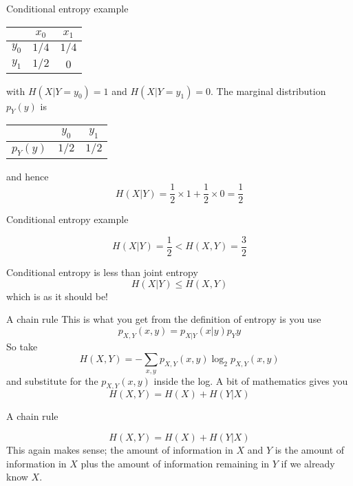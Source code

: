 \documentclass{beamer}
\newcommand{\crish}{\color{reddish}}
\newcommand{\cbla}{\color{black}}
\newcommand{\sm}{\color{reddish}$}
\newcommand{\fm}{$\color{black}{}}
\begin{document}
\begin{frame}{Conditional entropy example}
\begin{center}
\color{purple}
    \begin{tabular}{c|cc}
&$x_0$&$x_1$\\
\hline
$y_0$&$1/4$&$1/4$\\
$y_1$&$1/2$&$0$
    \end{tabular}
    \color{black}
\end{center}
with \sm{}H(X|Y=y_0)=1\fm{} and \sm{}H(X|Y=y_1)=0\fm{}. The marginal distribution \sm{}p_Y(y)\fm{} is
\begin{center}
\color{purple}
    \begin{tabular}{c|cc}
  &$y_0$&$y_1$\\
\hline
$p_Y(y)$&$1/2$&$1/2$\\
    \end{tabular}
    \cbla
    \end{center}
and hence
\crish
$$
H(X|Y)=\frac{1}{2}\times 1 + \frac{1}{2}\times 0 =\frac{1}{2}
$$
\cbla
\end{frame}


\begin{frame}{Conditional entropy example}

\crish
$$
H(X|Y)=\frac{1}{2}< H(X,Y) = \frac{3}{2}
$$
\cbla
\end{frame}


\begin{frame}{Conditional entropy is less than joint entropy}
\crish
$$
H(X|Y) \le H(X,Y) 
$$
\cbla
which is as it should be!
\end{frame}

\begin{frame}{A chain rule}
  This is what you get from the definition of entropy is you use
  \crish
  $$
p_{X,Y}(x,y)=p_{X|Y}(x|y)p_Y{y}
$$
\cbla
So take
\crish
$$
H(X,Y)=-\sum_{x,y} p_{X,Y}(x,y)\log_2{p_{X,Y}(x,y)}
$$
\cbla
and substitute for the \sm{}p_{X,Y}(x,y)\fm{} inside the log. A bit of mathematics gives you
\crish
$$
H(X,Y)=H(X)+H(Y|X)
$$
\cbla
\end{frame}


\begin{frame}{A chain rule}

\crish
$$
H(X,Y)=H(X)+H(Y|X)
$$ \cbla This again makes sense; the amount of information in
\sm{}X\fm{} and \sm{}Y\fm{} is the amount of information in
\sm{}X\fm{} plus the amount of information remaining in \sm{}Y\fm{} if
we already know \sm{}X\fm{}.

\end{frame}
\end{document}
